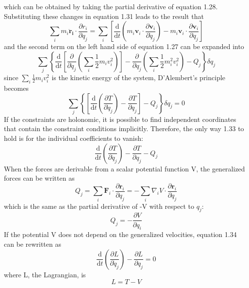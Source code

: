 \documentclass[]{article}
\numberwithin{equation}{section}
\begin{document}
which can be obtained by taking the partial derivative of equation 1.28.
Substituting these changes in equation 1.31 leads to the result that
$$\sum_im_i\mathbf{\ddot r_i}\cdot\frac{\partial r_i}{\partial q_j}=\sum_i\left[\frac{\mathrm d}{\mathrm dt}\left(m_i\mathbf v_i\cdot\frac{\partial\mathbf v_i}{\partial\dot q_j}\right)-m_i\mathbf v_i\cdot\frac{\partial\mathbf v_i}{\partial q_j}\right]$$
and the second term on the left hand side of equation 1.27 can be expanded into
$$
\sum_j \left\{\frac{\mathrm d}{\mathrm dt}\left[\frac{\partial}{\partial\dot q_j}\left(\sum_i\frac{1}{2} m_iv_i^2\right)\right]-\frac{\partial}{\partial q_j}\left(\sum_i\frac 12m_i^2v_i^2\right)-Q_j\right\}\delta q_j
$$
since $\sum_i\frac 12m_iv_i^2$ is the kinetic energy of the system, D'Alembert's principle becomes
\begin{equation}\sum_j\left\{\left[\frac{\mathrm d}{\mathrm dt}\left(\frac{\partial T}{\partial\dot q_j}\right)-\frac{\partial T}{\partial q_j}\right]-Q_j\right\}\delta q_j=0\end{equation}
If the constraints are holonomic, it is possible to find independent coordinates that contain the constraint conditions implicitly. Therefore, the only way 1.33 to hold is for the individual coefficients to vanish:
\begin{equation}\frac{\mathrm d}{\mathrm dt}\left(\frac{\partial T}{\partial\dot q_j}\right)-\frac{\partial T}{\partial q_j}-Q_j\end{equation}
When the forces are derivable from a scalar potential function V, the generalized forces can be written as
$$Q_j=\sum_i\mathbf F_i\cdot\frac{\partial\mathbf r_i}{\partial q_j}=-\sum_i\nabla_iV\cdot\frac{\partial\mathbf r_i}{\partial q_j}$$
which is the same as the partial derivative of -V with respect to $q_j$:
$$Q_j=-\frac{\partial V}{\partial q_i}$$
If the potential V does not depend on the generalized velocities, equation 1.34 can be rewritten as
\begin{equation}\boxed{\frac{\mathrm d}{\mathrm dt}\left(\frac{\partial L}{\partial\dot q_j}\right)-\frac{\partial L}{\partial q_j}=0}\end{equation}
where L, the Lagrangian, is 
\begin{equation}L=T-V\end{equation}
\end{document}
